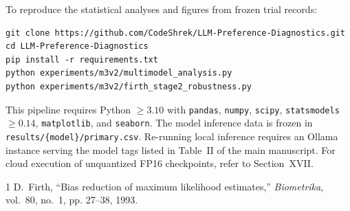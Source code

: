 \documentclass[10pt,journal,compsoc]{IEEEtran}
\begin{document}
To reproduce the statistical analyses and figures from frozen trial records:
\begin{lstlisting}
git clone https://github.com/CodeShrek/LLM-Preference-Diagnostics.git
cd LLM-Preference-Diagnostics
pip install -r requirements.txt
python experiments/m3v2/multimodel_analysis.py
python experiments/m3v2/firth_stage2_robustness.py
\end{lstlisting}

This pipeline requires Python $\geq 3.10$ with \texttt{pandas}, \texttt{numpy}, \texttt{scipy}, \texttt{statsmodels $\geq 0.14$}, \texttt{matplotlib}, and \texttt{seaborn}. The model inference data is frozen in \texttt{results/\{model\}/primary.csv}. Re-running local inference requires an Ollama instance serving the model tags listed in Table~II of the main manuscript. For cloud execution of unquantized FP16 checkpoints, refer to Section~XVII.

\begin{thebibliography}{1}
D.~Firth, ``Bias reduction of maximum likelihood estimates,'' \textit{Biometrika}, vol.~80, no.~1, pp. 27--38, 1993.
\end{thebibliography}
\end{document}
